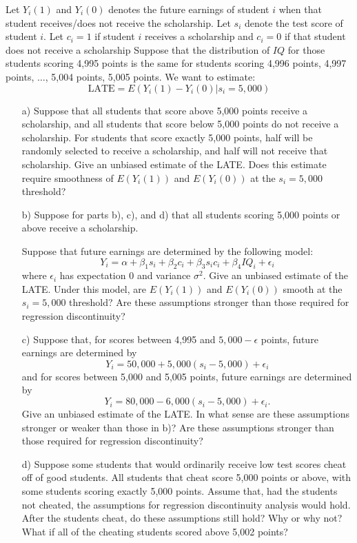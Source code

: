 \documentclass{article}
\begin{document}
\begin{itemize}
   Let $Y_i(1)$ and $Y_i(0)$ denotes the future earnings of student $i$
   when that student receives/does not receive the scholarship.        
   Let $s_i$ denote the test score of student $i$.   
   Let $c_i =1$ if student $i$ receives a scholarship
   and $c_i = 0$ if that student does not receive a scholarship
   Suppose that the distribution of $IQ$ for those students scoring 4,995 points 
   is the same for students scoring 4,996 points, 4,997 points, 
   $\ldots$, 5,004 points, 5,005 points.
   We want to estimate:
   $$
     \text{LATE} = E(Y_i(1) - Y_i(0) | s_i = 5,000)
   $$
   \begin{itemize}
     \item[a)] 
       Suppose that all students that score above 5,000 points receive a scholarship, and
       all students that score below 5,000 points do not receive a scholarship.
       For students that score exactly 5,000 points, half will be randomly selected to receive
       a scholarship, and half will not receive that scholarship.
       Give an unbiased estimate of the LATE.
       Does this estimate require smoothness of $E(Y_i(1))$ and $E(Y_i(0))$ 
       at the $s_i = 5,000$ threshold?
     \item[b)]
       Suppose for parts b), c), and d) that all students scoring 5,000 points or above
       receive a scholarship.
       
       Suppose that future earnings are determined by the following model:
       $$
         Y_i = \alpha + \beta_1 s_i + \beta_2c_i 
                +\beta_3s_ic_i + \beta_4IQ_i + \epsilon_i
       $$
       where $\epsilon_i$ has expectation $0$ and variance $\sigma^2$.
       Give an unbiased estimate of the LATE.
       Under this model, are $E(Y_i(1))$ and $E(Y_i(0))$ smooth at the 
       $s_i = 5,000$ threshold?
       Are these assumptions stronger than those 
       required for regression discontinuity?
     \item[c)]
       Suppose that, for scores between 4,995 and $5,000-\epsilon$ points, 
       future earnings are determined by
       $$
         Y_i = 50,000 + 5,000(s_i - 5,000) + \epsilon_i
       $$
       and for scores between 5,000 and 5,005 points, future earnings are determined by
       $$
         Y_i = 80,000 - 6,000(s_i - 5,000) + \epsilon_i.
       $$
       Give an unbiased estimate of the LATE.
       In what sense are these assumptions stronger or weaker than those in b)?
       Are these assumptions stronger than those required for regression discontinuity?
     \item[d)]
       Suppose some students that would ordinarily receive low test scores cheat off of good students.
       All students that cheat score 5,000 points or above, 
       with some students scoring exactly 5,000 points.
       Assume that, had the students not cheated, 
       the assumptions for regression discontinuity analysis would hold. 
       After the students cheat, do these assumptions still hold?
       Why or why not?
       What if all of the cheating students scored above 5,002 points?
  \end{itemize}


\end{itemize}
\end{document}
